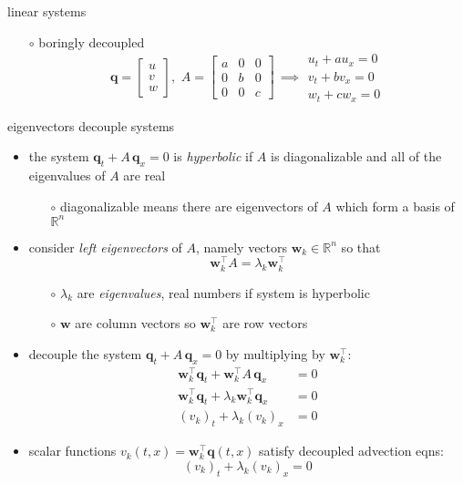 \documentclass[10pt,hyperref]{beamer}
\newcommand{\bq}{\mathbf{q}}
\newcommand{\bw}{\mathbf{w}}
\newcommand{\RR}{\mathbb{R}}
\begin{document}
\begin{frame}{linear systems}
\begin{itemize}
\begin{itemize}
    \item[$\circ$] boringly decoupled
        $$\bq = \begin{bmatrix} u \\ v \\ w \end{bmatrix}, \,\, A = \begin{bmatrix} a & 0 & 0 \\ 0 & b & 0 \\ 0 & 0 & c \end{bmatrix} \, \implies \begin{matrix} u_t + a u_x = 0 \\ v_t + b v_x = 0 \\ w_t + c w_x = 0 \end{matrix}$$
    \end{itemize}
\end{itemize}
\end{frame}


\begin{frame}{eigenvectors decouple systems}

\begin{itemize}
\item the system $\bq_t + A\, \bq_x=0$ is \emph{hyperbolic} if $A$ is diagonalizable and all of the eigenvalues of $A$ are real
    \begin{itemize}
    \item[$\circ$] diagonalizable means there are eigenvectors of $A$ which form a basis of $\RR^n$
    \end{itemize}
\item consider \emph{left eigenvectors} of $A$, namely vectors $\bw_k \in \RR^n$ so that
    $$\bw_k^\top A = \lambda_k \bw_k^\top$$

\vspace{-2mm}
    \begin{itemize}
    \item[$\circ$] $\lambda_k$ are \emph{eigenvalues}, real numbers if system is hyperbolic
    \item[$\circ$] $\bw$ are column vectors so $\bw_k^\top$ are row vectors
    \end{itemize}
\item decouple the system $\bq_t + A\, \bq_x=0$ by multiplying by $\bw_k^\top$:
\begin{align*}
\bw_k^\top \bq_t + \bw_k^\top A\, \bq_x &= 0 \\
\bw_k^\top \bq_t + \lambda_k \bw_k^\top \bq_x &= 0 \\
(v_k)_t + \lambda_k (v_k)_x &= 0
\end{align*}
\item scalar functions $v_k(t,x) = \bw_k^\top \bq(t,x)$ satisfy decoupled advection eqns:
   $$(v_k)_t + \lambda_k (v_k)_x = 0$$
\end{itemize}
\end{frame}
\end{document}
